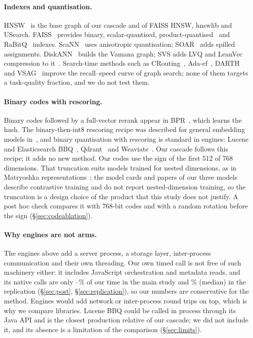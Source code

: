 \paragraph{Indexes and quantisation.} HNSW~\cite{malkov2020hnsw} is the base graph of our cascade and of FAISS HNSW,
hnswlib and USearch. FAISS~\cite{johnson2021faissgpu,douze2024faiss} provides binary, scalar-quantised,
product-quantised~\cite{jegou2011pq} and RaBitQ~\cite{gao2024rabitq,gao2025extrabitq} indexes. ScaNN~\cite{guo2020scann}
uses anisotropic quantisation; SOAR~\cite{sun2023soar} adds spilled assignments. DiskANN~\cite{subramanya2019diskann}
builds the Vamana graph; SVS adds LVQ and LeanVec compression to it~\cite{aguerrebere2023lvq,tepper2024leanvec}.
Search-time methods such as CRouting~\cite{li2025crouting}, Ada-ef~\cite{zhang2026adaef}, DARTH~\cite{chatzakis2025darth}
and VSAG~\cite{zhong2025vsag} improve the recall--speed curve of graph search; none of them targets a task-quality
fraction, and we do not test them.

\paragraph{Binary codes with rescoring.} Binary codes followed by a full-vector rerank appear in BPR~\cite{yamada2021bpr},
which learns the hash. The binary-then-int8 rescoring recipe was described for general embedding models
in~\cite{shakir2024embeddingquant}, and binary quantisation with rescoring is standard in engines: Lucene and
Elasticsearch BBQ~\cite{trent2024bbq}, Qdrant~\cite{qdrant2026quantization} and Weaviate~\cite{weaviate2026bq}. Our
cascade follows this recipe; it adds no new method. Our codes use the sign of the first 512 of 768 dimensions. That
truncation suits models trained for nested dimensions, as in Matryoshka representations~\cite{kusupati2022matryoshka}; the
model cards and papers of our three models~\cite{suresh2025cornstack,gunther2023jina2,xiao2024cpack} describe contrastive
training and do not report nested-dimension training, so the truncation is a design choice of the product that this
study does not justify. A post hoc check compares it with 768-bit codes and with a random rotation before the sign (\S\ref{sec:codeablation}).

\paragraph{Why engines are not arms.} The engines above add a server process, a storage layer, inter-process
communication and their own threading. Our own timed call is not free of such machinery either: it includes JavaScript
orchestration and metadata reads, and its native calls are only --\% of our time in the
main study and \% (median) in the replication (\S\ref{sec:post}, \S\ref{sec:replication}), so our numbers are
conservative for the method. Engines would add network or inter-process round trips on top, which is why we compare
libraries. Lucene BBQ could be called in process through its Java API and is the closest
production relative of our cascade; we did not include it, and its absence is a limitation of the comparison
(\S\ref{sec:limits}).

